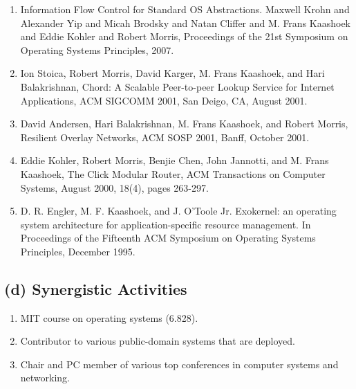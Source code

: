 \documentclass{article}
\begin{document}
\begin{enumerate}{
  \setlength{\topsep}{-10pt}
  \setlength{\itemsep}{0pt}
  \setlength{\parskip}{0pt}}

\item Information Flow Control for Standard OS Abstractions. Maxwell
  Krohn and Alexander Yip and Micah Brodsky and Natan Cliffer and
  M. Frans Kaashoek and Eddie Kohler and Robert Morris, Proceedings
  of the 21st Symposium on Operating Systems Principles, 2007.

\item Ion Stoica, Robert Morris, David Karger, M. Frans Kaashoek, and
  Hari Balakrishnan, Chord: A Scalable Peer-to-peer Lookup Service for
  Internet Applications, ACM SIGCOMM 2001, San Deigo, CA, August 2001.

\item David Andersen, Hari Balakrishnan, M. Frans Kaashoek, and Robert
  Morris, Resilient Overlay Networks, ACM SOSP 2001, Banff, October
  2001.

\item Eddie Kohler, Robert Morris, Benjie Chen, John Jannotti, and
  M. Frans Kaashoek, The Click Modular Router, ACM Transactions on
  Computer Systems, August 2000, 18(4), pages 263-297.

\item D. R. Engler, M. F. Kaashoek, and J. O'Toole Jr. Exokernel: an
  operating system architecture for application-specific resource
  management. In Proceedings of the Fifteenth ACM Symposium on
  Operating Systems Principles, December 1995.

\end{enumerate}

\subsection*{(d) Synergistic Activities}

\begin{enumerate}

\item MIT course on operating systems (6.828).

\item Contributor to various public-domain systems that are deployed.

\item Chair and PC member of various top conferences in computer
systems and networking.

\end{enumerate}
\end{document}
